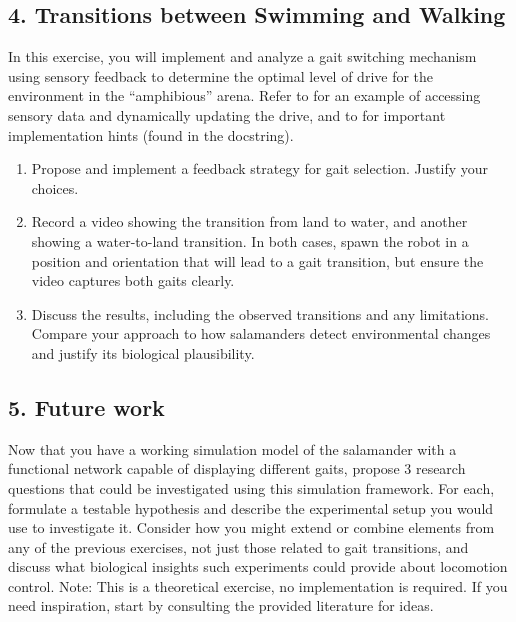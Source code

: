 \documentclass{cmc}
\begin{document}
\subsection*{4. Transitions between Swimming and Walking}\label{sec:transitions}

In this exercise, you will implement and analyze a gait switching mechanism using sensory feedback to determine the optimal level of drive for the environment in the ``amphibious'' arena.
Refer to  for an example of accessing sensory data and dynamically updating the drive, and to  for important implementation hints (found in the docstring).

\begin{enumerate}
  \item Propose and implement a feedback strategy for gait selection.
        Justify your choices.
  \item Record a video showing the transition from land to water, and another showing a water-to-land transition.
        In both cases, spawn the robot in a position and orientation that will lead to a gait transition, but ensure the video captures both gaits clearly.
  \item Discuss the results, including the observed transitions and any limitations.
        Compare your approach to how salamanders detect environmental changes and justify its biological plausibility.
\end{enumerate}


\subsection*{5. Future work}\label{sec:future-work}

Now that you have a working simulation model of the salamander with a functional network capable of displaying different gaits, propose 3 research questions that could be investigated using this simulation framework.
For each, formulate a testable hypothesis and describe the experimental setup you would use to investigate it.
Consider how you might extend or combine elements from any of the previous exercises, not just those related to gait transitions, and discuss what biological insights such experiments could provide about locomotion control.
Note: This is a theoretical exercise, no implementation is required.
If you need inspiration, start by consulting the provided literature for ideas.
\end{document}
